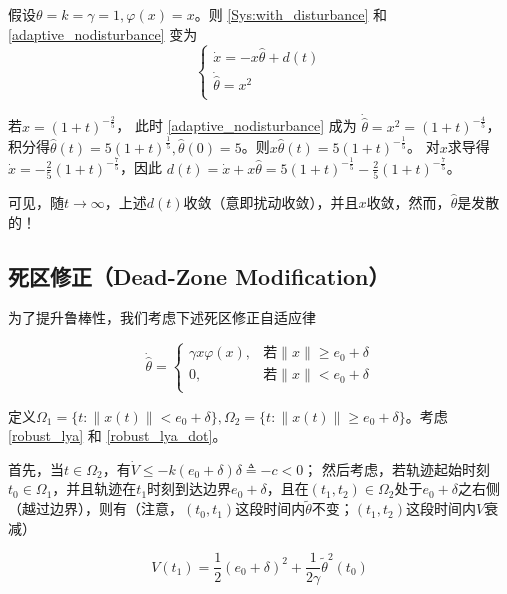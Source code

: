 \begin{example}[扰动衰减但参数估计发散]
    假设\(\theta = k = \gamma = 1,\varphi(x) = x\)。则 \eqref{Sys:with_disturbance} 和 \eqref{adaptive_nodisturbance} 变为
\[\begin{cases}
\dot{x} = - x\hat{\theta} + d(t) \\
\dot{\hat{\theta}} = x^{2} \\
\end{cases}\]

若$x = (1 + t)^{- \frac{2}{5}} $，
此时 \eqref{adaptive_nodisturbance} 成为
$\dot{\hat{\theta}} = x^{2} = (1 + t)^{- \frac{4}{5}} $，
积分得$\hat{\theta}(t) = 5(1 + t)^{\frac{1}{5}},\hat{\theta}(0) = 5$。则\(x\hat{\theta}(t) = 5(1 + t)^{- \frac{1}{5}}\)。
对$x$求导得$\dot{x} = - \frac{2}{5}(1 + t)^{- \frac{7}{5}}$，因此
$d(t) = \dot{x} + x\hat{\theta} = 5(1 + t)^{- \frac{1}{5}} - \frac{2}{5}(1 + t)^{- \frac{7}{5}}$。

可见，随$t\to\infty$，上述\(d(t)\)收敛（意即扰动收敛），并且\(x\)收敛，然而，\(\hat{\theta}\)是发散的！
\end{example}

\subsection{死区修正（Dead-Zone Modification）}

为了提升鲁棒性，我们考虑下述死区修正自适应律

\[\dot{\hat{\theta}} = \left\{\begin{matrix}
\gamma x\varphi(x), & \text{若} \| x \| \geq e_{0} + \delta \\
0, & \text{若} \| x \| < e_{0} + \delta \\
\end{matrix}\right.\]

定义\(\Omega_{1} = \{ t: \| x(t) \| < e_{0} + \delta\},\Omega_{2} = \{ t: \| x(t) \| \geq e_{0} + \delta\}\)。考虑\eqref{robust_lya} 和 \eqref{robust_lya_dot}。

首先，当\(t \in \Omega_{2}\)，有\(\dot{V} \leq - k(e_{0} + \delta)\delta \triangleq - c < 0\)；
然后考虑，若轨迹起始时刻\(t_{0} \in \Omega_{1}\)，并且轨迹在\(t_{1}\)时刻到达边界\(e_{0} + \delta\)，且在\((t_{1},t_{2}) \in \Omega_{2}\)处于\(e_{0} + \delta\)之右侧（越过边界），则有（注意，$(t_0,t_1)$这段时间内$\tilde{\theta}$不变；$(t_1,t_2)$这段时间内$V$衰减）

\[V(t_{1}) = \frac{1}{2}(e_{0} + \delta)^{2} + \frac{1}{2\gamma}{\tilde{\theta}}^{2}(t_{0})\]

